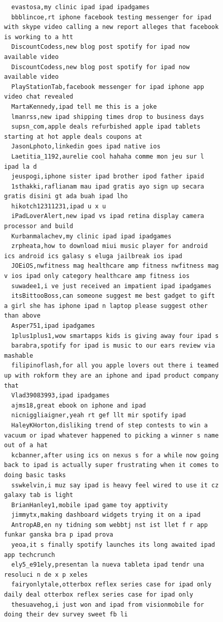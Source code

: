 \begin{figure}[htpb]
\begin{verbatim}
  evastosa,my clinic ipad ipad ipadgames
  bbblincoe,rt iphone facebook testing messenger for ipad with skype video calling a new report alleges that facebook is working to a htt
  DiscountCodess,new blog post spotify for ipad now available video
  DiscountCodess,new blog post spotify for ipad now available video
  PlayStationTab,facebook messenger for ipad iphone app video chat revealed
  MartaKennedy,ipad tell me this is a joke
  lmanrss,new ipad shipping times drop to business days
  supsn_com,apple deals refurbished apple ipad tablets starting at hot apple deals coupons at
  JasonLphoto,linkedin goes ipad native ios
  Laetitia_1192,aurelie cool hahaha comme mon jeu sur l ipad la d
  jeuspogi,iphone sister ipad brother ipod father ipaid
  1sthakki,raflianam mau ipad gratis ayo sign up secara gratis disini gt ada buah ipad lho
  hikotch12311231,ipad u x u
  iPadLoverAlert,new ipad vs ipad retina display camera processor and build
  Kurbanmalachev,my clinic ipad ipad ipadgames
  zrpheata,how to download miui music player for android ics android ics galasy s eluga jailbreak ios ipad
  JOEiOS,nwfitness mag healthcare amp fitness nwfitness mag v ios ipad only category healthcare amp fitness ios
  suwadee1,i ve just received an impatient ipad ipadgames
  itsBittooBoss,can someone suggest me best gadget to gift a girl she has iphone ipad n laptop please suggest other than above
  Asper751,ipad ipadgames
  1plus1plus1,wow smartapps kids is giving away four ipad s
  barabra,spotify for ipad is music to our ears review via mashable
  filipinoflash,for all you apple lovers out there i teamed up with rokform they are an iphone and ipad product company that
  Vlad39083993,ipad ipadgames
  ajms18,great ebook on iphone and ipad
  nicniggliaigner,yeah rt gef llt mir spotify ipad
  HaleyKHorton,disliking trend of step contests to win a vacuum or ipad whatever happened to picking a winner s name out of a hat
  kcbanner,after using ics on nexus s for a while now going back to ipad is actually super frustrating when it comes to doing basic tasks
  sswkelvin,i muz say ipad is heavy feel wired to use it cz galaxy tab is light
  BrianHanley1,mobile ipad game toy apptivity
  jimmytx,making dashboard widgets trying it on a ipad
  AntropAB,en ny tidning som webbtj nst ist llet f r app funkar ganska bra p ipad prova
  yeoa,it s finally spotify launches its long awaited ipad app techcrunch
  ely5_e91ely,presentan la nueva tableta ipad tendr una resoluci n de x p xeles
  fairyonlytale,otterbox reflex series case for ipad only daily deal otterbox reflex series case for ipad only
  thesuavehog,i just won and ipad from visionmobile for doing their dev survey sweet fb li

\end{verbatim}
\end{figure}
